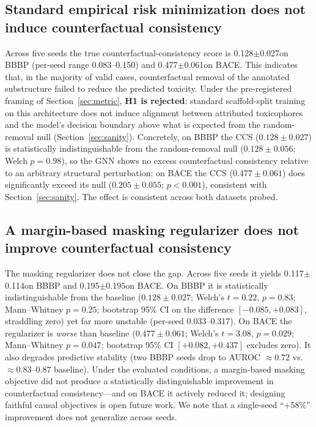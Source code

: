 \documentclass[a4paper,fleqn]{cas-dc}
\newcommand{\Fcausalstd}{0.128}
\newcommand{\Fcausalstdsd}{0.027} %
\newcommand{\Fcausalreg}{0.117}
\newcommand{\Fcausalregsd}{0.114} %
\newcommand{\BACEcausalstd}{0.477}
\newcommand{\BACEcausalstdsd}{0.061} %
\newcommand{\BACEcausalreg}{0.195}
\newcommand{\BACEcausalregsd}{0.195} %
\begin{document}
\subsection{Standard empirical risk minimization does not induce counterfactual consistency}
\label{sec:nullres}
Across five seeds the true counterfactual-consistency score is \Fcausalstd$\pm$\Fcausalstdsd on BBBP (per-seed range 0.083--0.150) and \BACEcausalstd$\pm$\BACEcausalstdsd on BACE. This indicates that, in the majority of valid cases, counterfactual removal of the annotated substructure failed to reduce the predicted toxicity. Under the pre-registered framing of Section~\ref{sec:metric}, \textbf{H1 is rejected}: standard scaffold-split training on this architecture does not induce alignment between attributed toxicophores and the model's decision boundary above what is expected from the random-removal null (Section~\ref{sec:sanity}). Concretely, on BBBP the CCS ($0.128\pm0.027$) is statistically indistinguishable from the random-removal null ($0.128\pm0.056$; Welch $p=0.98$), so the GNN shows no excess counterfactual consistency relative to an arbitrary structural perturbation; on BACE the CCS ($0.477\pm0.061$) does significantly exceed its null ($0.205\pm0.055$; $p<0.001$), consistent with Section~\ref{sec:sanity}. The effect is consistent across both datasets probed.

\subsection{A margin-based masking regularizer does not improve counterfactual consistency}
\label{sec:reg}
The masking regularizer does not close the gap. Across five seeds it yields \Fcausalreg$\pm$\Fcausalregsd on BBBP and \BACEcausalreg$\pm$\BACEcausalregsd on BACE. On BBBP it is statistically indistinguishable from the baseline ($0.128\pm0.027$; Welch's $t=0.22$, $p=0.83$; Mann--Whitney $p=0.25$; bootstrap 95\% CI on the difference $[-0.085, +0.083]$, straddling zero) yet far more unstable (per-seed 0.033--0.317). On BACE the regularizer is \emph{worse} than baseline ($0.477\pm0.061$; Welch's $t=3.08$, $p=0.029$; Mann--Whitney $p=0.047$; bootstrap 95\% CI $[+0.082, +0.437]$ excludes zero). It also degrades predictive stability (two BBBP seeds drop to AUROC $\approx 0.72$ vs.~$\approx 0.83$--$0.87$ baseline). Under the evaluated conditions, a margin-based masking objective did not produce a statistically distinguishable improvement in counterfactual consistency---and on BACE it actively reduced it; designing faithful causal objectives is open future work. We note that a single-seed ``+58\%'' improvement does not generalize across seeds.
\end{document}
